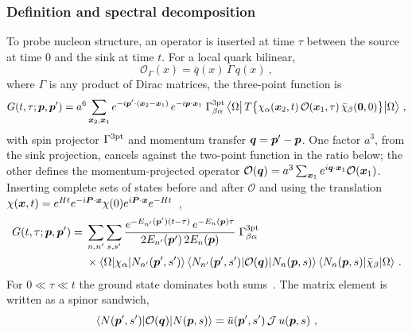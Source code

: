\subsubsection{Definition and spectral decomposition}
To probe nucleon structure, an operator is inserted at time $\tau$ between the source at time $0$ and the sink at time $t$. For a local quark bilinear,
\begin{equation}
    \mathcal O_\Gamma(x)=\bar q(x)\,\Gamma\,q(x) \ ,
    \label{eq:local_op}
\end{equation}
where $\Gamma$ is any product of Dirac matrices, the three-point function is~\cite{Lin:2014}
\begin{equation}
    G(t,\tau;\boldsymbol{p},\boldsymbol{p}')=a^6\sum_{\boldsymbol{x}_2,\boldsymbol{x}_1}e^{-i\boldsymbol{p}'\cdot(\boldsymbol{x}_2-\boldsymbol{x}_1)}\,e^{-i\boldsymbol{p}\cdot\boldsymbol{x}_1}\;\Gamma^{\rm 3pt}_{\beta\alpha}\,\big\langle\Omega\big|\,T\big\{\chi_\alpha(\boldsymbol{x}_2,t)\,\mathcal O(\boldsymbol{x}_1,\tau)\,\bar\chi_\beta(\boldsymbol{0},0)\big\}\big|\Omega\big\rangle \ ,
    \label{eq:c3pt_def}
\end{equation}
with spin projector $\Gamma^{\rm 3pt}$ and momentum transfer $\boldsymbol{q}=\boldsymbol{p}'-\boldsymbol{p}$. One factor $a^3$, from the sink projection, cancels against the two-point function in the ratio below; the other defines the momentum-projected operator $\mathcal O(\boldsymbol{q})=a^3\sum_{\boldsymbol{x}_1}e^{i\boldsymbol{q}\cdot\boldsymbol{x}_1}\mathcal O(\boldsymbol{x}_1)$. Inserting complete sets of states before and after $\mathcal O$ and using the translation $\chi(\boldsymbol{x},t)=e^{Ht}e^{-i\boldsymbol{P}\cdot\boldsymbol{x}}\chi(0)e^{i\boldsymbol{P}\cdot\boldsymbol{x}}e^{-Ht}$~\cite{Lin:2014},
\begin{equation}
\begin{split}
    G(t,\tau;\boldsymbol{p},\boldsymbol{p}')={}&\sum_{n,n'}\sum_{s,s'}\frac{e^{-E_{n'}(\boldsymbol{p}')(t-\tau)}\,e^{-E_n(\boldsymbol{p})\tau}}{2E_{n'}(\boldsymbol{p}')\,2E_n(\boldsymbol{p})}\;\Gamma^{\rm 3pt}_{\beta\alpha}\\
    &\times\langle\Omega|\chi_\alpha|N_{n'}(\boldsymbol{p}',s')\rangle\,\langle N_{n'}(\boldsymbol{p}',s')|\mathcal O(\boldsymbol{q})|N_n(\boldsymbol{p},s)\rangle\,\langle N_n(\boldsymbol{p},s)|\bar\chi_\beta|\Omega\rangle \ .
\end{split}
    \label{eq:c3pt_spectral}
\end{equation}
For $0\ll\tau\ll t$ the ground state dominates both sums~\cite{Lin:2014}. The matrix element is written as a spinor sandwich,
\begin{equation}
    \langle N(\boldsymbol{p}',s')|\mathcal O(\boldsymbol{q})|N(\boldsymbol{p},s)\rangle=\bar u(\boldsymbol{p}',s')\,\mathcal J\,u(\boldsymbol{p},s) \ ,
    \label{eq:me_sandwich}
\end{equation}
